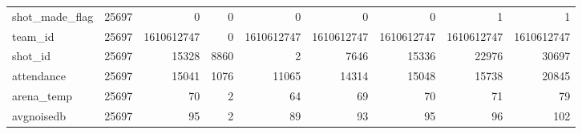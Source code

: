 {\begin{tabular}{lrrrrrrrr}
    shot\_made\_flag    &  25697 &          0 &       0 &          0 &          0 &          0 &          1 &          1 \\
    team\_id           &  25697 & 1610612747 &       0 & 1610612747 & 1610612747 & 1610612747 & 1610612747 & 1610612747 \\
    shot\_id           &  25697 &      15328 &    8860 &          2 &       7646 &      15336 &      22976 &      30697 \\
    attendance        &  25697 &      15041 &    1076 &      11065 &      14314 &      15048 &      15738 &      20845 \\
    arena\_temp        &  25697 &         70 &       2 &         64 &         69 &         70 &         71 &         79 \\
    avgnoisedb        &  25697 &         95 &       2 &         89 &         93 &         95 &         96 &        102 \\
    \bottomrule
    \end{tabular}}
    \label{tbl:featuresummary}



